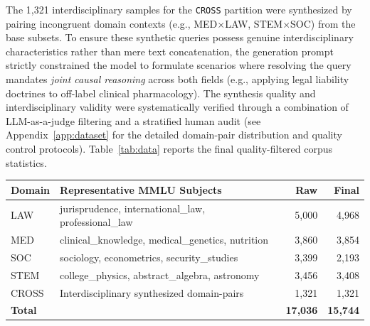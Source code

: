 \documentclass[a4paper,fleql]{cas-sc}
\begin{document}
The 1,321 interdisciplinary samples for the \texttt{CROSS}
partition were synthesized by pairing incongruent domain contexts
(e.g., MED$\times$LAW, STEM$\times$SOC) from the base subsets. To ensure
these synthetic queries possess genuine interdisciplinary characteristics
rather than mere text concatenation, the generation prompt strictly
constrained the model to formulate scenarios where resolving the query
mandates \emph{joint causal reasoning} across both fields (e.g., applying
legal liability doctrines to off-label clinical pharmacology). The synthesis
quality and interdisciplinary validity were systematically verified through a
combination of LLM-as-a-judge filtering and a stratified human audit (see
Appendix~\ref{app:dataset} for the detailed domain-pair distribution and
quality control protocols). Table~\ref{tab:data} reports the final
quality-filtered corpus statistics.

\vspace{6pt plus 4pt minus 3pt}
\begin{center}
\begingroup
{}
\label{tab:data}
\begin{tabular}{llrr}
\toprule
\textbf{Domain} & \textbf{Representative MMLU Subjects} & \textbf{Raw} & \textbf{Final} \\
\midrule
LAW   & jurisprudence, international\_law, professional\_law  & 5{,}000 & 4{,}968 \\
MED   & clinical\_knowledge, medical\_genetics, nutrition      & 3{,}860 & 3{,}854 \\
SOC   & sociology, econometrics, security\_studies             & 3{,}399 & 2{,}193 \\
STEM  & college\_physics, abstract\_algebra, astronomy         & 3{,}456 & 3{,}408 \\
CROSS & Interdisciplinary synthesized domain-pairs             & 1{,}321 & 1{,}321 \\
\midrule
\textbf{Total} & & \textbf{17{,}036} & \textbf{15{,}744} \\
\bottomrule
\end{tabular}
\endgroup
\end{center}
\vspace{6pt plus 4pt minus 3pt}
\end{document}
